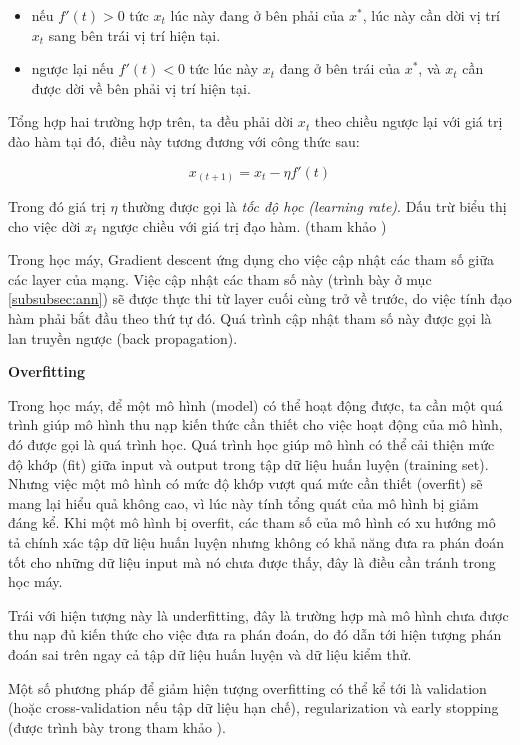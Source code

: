 \begin{itemize}
    \item nếu $f'(t)>0$ tức $x_t$ lúc này đang ở bên phải của $x^*$, lúc này cần dời vị trí $x_t$ sang bên trái vị trí hiện tại.
    \item ngược lại nếu $f'(t)<0$ tức lúc này $x_t$ đang ở bên trái của $x^*$, và $x_t$ cần được dời về bên phải vị trí hiện tại.
\end{itemize}

Tổng hợp hai trường hợp trên, ta đều phải dời $x_t$ theo chiều ngược lại với giá trị đào hàm tại đó, điều này tương đương với công thức sau:

\begin{equation}
    x_(t+1) = x_t - \eta f'(t)
\end{equation}

Trong đó giá trị $\eta$ thường được gọi là \textit{tốc độ học (learning rate)}. Dấu trừ biểu thị cho việc dời $x_t$ ngược chiều với giá trị đạo hàm. (tham khảo \cite{tiep2018machine})

Trong học máy, Gradient descent ứng dụng cho việc cập nhật các tham số giữa các layer của mạng. Việc cập nhật các tham số này (trình bày ở mục \ref{subsubsec:ann}) sẽ được thực thi từ layer cuối cùng trở về trước, do việc tính đạo hàm phải bắt đầu theo thứ tự đó. Quá trình cập nhật tham số  này được gọi là lan truyền ngược (back propagation).

\textbf{Overfitting}

Trong học máy, để một mô hình (model) có thể hoạt động được, ta cần một quá trình giúp mô hình thu nạp kiến thức cần thiết cho việc hoạt động của mô hình, đó được gọi là quá trình học. Quá trình học giúp mô hình có thể cải thiện mức độ khớp (fit) giữa input và output trong tập dữ liệu huấn luyện (training set). Nhưng việc một mô hình có mức độ khớp vượt quá mức cần thiết (overfit) sẽ mang lại hiểu quả không cao, vì lúc này tính tổng quát của mô hình bị giảm đáng kể. Khi một mô hình bị overfit, các tham số của mô hình có xu hướng mô tả chính xác tập dữ liệu huấn luyện nhưng không có khả năng đưa ra phán đoán tốt cho những dữ liệu input mà nó chưa được thấy, đây là điều cần tránh trong học máy.

Trái với hiện tượng này là underfitting, đây là trường hợp mà mô hình chưa được thu nạp đủ kiến thức cho việc đưa ra phán đoán, do đó dẫn tới hiện tượng phán đoán sai trên ngay cả tập dữ liệu huấn luyện và dữ liệu kiểm thử.

Một số phương pháp để giảm hiện tượng overfitting có thể kể tới là validation (hoặc cross-validation nếu tập dữ liệu hạn chế), regularization và early stopping (được trình bày trong tham khảo \cite{tiep2018machine}).

